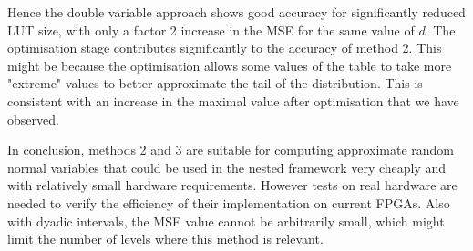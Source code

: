 Hence the double variable approach shows good accuracy for significantly reduced LUT size, with only a factor 2 increase in the MSE for the same value of $d$. The optimisation stage contributes significantly to the accuracy of method 2. This might be because the optimisation allows some values of the table to take more "extreme" values to better approximate the tail of the distribution. This is consistent with an increase in the maximal value after optimisation that we have observed. %


In conclusion, methods 2 and 3 are suitable for computing approximate random normal variables that could be used in the nested framework very cheaply and with relatively small hardware requirements. However tests on real hardware are needed to
verify the efficiency of their implementation on current FPGAs. 
Also with dyadic intervals, the MSE value cannot be arbitrarily small, which might limit the number of levels where this method is relevant.
